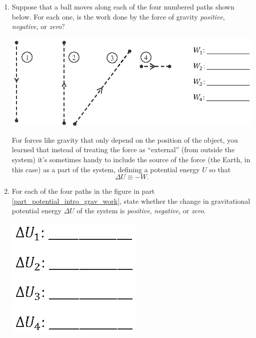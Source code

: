 \begin{enumerate}[wide, label=(\emph{\alph*})]

\item Suppose that a ball moves along each of the four numbered paths shown below.  For each one, is the work done by the force of gravity \textit{positive}, \textit{negative}, or \textit{zero}? \label{part_potential_intro_grav_work} 
\begin{center}
\vspace{0.1in}
\includegraphics{potential_intro/activity_1_figs/gravity_paths.eps}
\vspace{0.1in}
\end{center}

For forces like gravity that only depend on the position of the object, you learned that instead of treating the force as  ``external'' (from outside the system) it's sometimes handy to include the source of the force (the Earth, in this case) as a part of the system, defining a potential energy $U$ so that
$$\Delta U \equiv -W.$$

\item For each of the four paths in the figure in part \ref{part_potential_intro_grav_work}, state whether the change in gravitational potential energy $\Delta U$ of the system is \textit{positive}, \textit{negative}, or \textit{zero}.
\begin{center}
\vspace{0.1in}
\includegraphics{potential_intro/activity_1_figs/gravity_potentials.eps}
\vspace{0.1in}
\end{center}


\end{enumerate}
